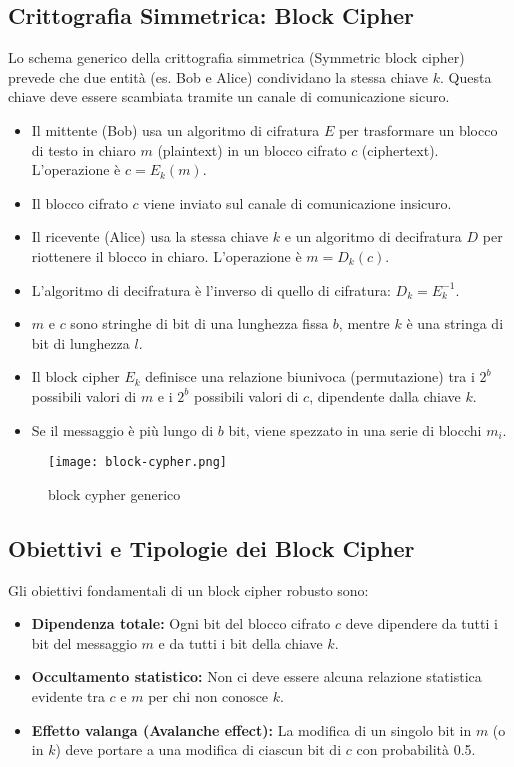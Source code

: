 \documentclass[../main.tex]{subfiles}
\begin{document}
\subsection{Crittografia Simmetrica: Block Cipher}
Lo schema generico della crittografia simmetrica (Symmetric block cipher) prevede che due entità (es. Bob e Alice) condividano la stessa chiave $k$. Questa chiave deve essere scambiata tramite un canale di comunicazione sicuro.

\begin{itemize}
	\item Il mittente (Bob) usa un algoritmo di cifratura $E$ per trasformare un blocco di testo in chiaro $m$ (plaintext) in un blocco cifrato $c$ (ciphertext). L'operazione è $c = E_k(m)$.
	\item Il blocco cifrato $c$ viene inviato sul canale di comunicazione insicuro.
	\item Il ricevente (Alice) usa la stessa chiave $k$ e un algoritmo di decifratura $D$ per riottenere il blocco in chiaro. L'operazione è $m = D_k(c)$.
	\item L'algoritmo di decifratura è l'inverso di quello di cifratura: $D_k = E_k^{-1}$.
	\item $m$ e $c$ sono stringhe di bit di una lunghezza fissa $b$, mentre $k$ è una stringa di bit di lunghezza $l$.
	\item Il block cipher $E_k$ definisce una relazione biunivoca (permutazione) tra i $2^b$ possibili valori di $m$ e i $2^b$ possibili valori di $c$, dipendente dalla chiave $k$.
	\item Se il messaggio è più lungo di $b$ bit, viene spezzato in una serie di blocchi $m_i$.
\end{itemize}

\begin{figure}[H]
	\centering
	\texttt{[image: block-cypher.png]}
	\caption{block cypher generico}
	\label{fig:etichetta}
\end{figure}


\subsection{Obiettivi e Tipologie dei Block Cipher}
Gli obiettivi fondamentali di un block cipher robusto sono:
\begin{itemize}
	\item \textbf{Dipendenza totale:} Ogni bit del blocco cifrato $c$ deve dipendere da tutti i bit del messaggio $m$ e da tutti i bit della chiave $k$.
	\item \textbf{Occultamento statistico:} Non ci deve essere alcuna relazione statistica evidente tra $c$ e $m$ per chi non conosce $k$.
	\item \textbf{Effetto valanga (Avalanche effect):} La modifica di un singolo bit in $m$ (o in $k$) deve portare a una modifica di ciascun bit di $c$ con probabilità 0.5.
\end{itemize}
\end{document}
